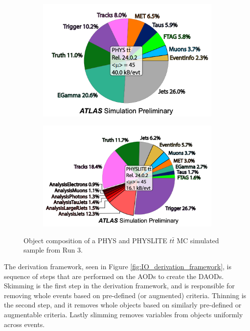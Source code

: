 \begin{figure}[h]
  \centering
  \vspace{20px}
  \begin{subfigure}{.5\textwidth}
      \centering
      \includegraphics[width=\textwidth]{content/img/tt_PHYS.png}
      \label{fig:IO_tt_PHYS_subA}
    \end{subfigure}%
    \begin{subfigure}{.5\textwidth}
      \centering
      \includegraphics[width=\textwidth]{content/img/tt_PHYSLITE.png}
      \label{fig:IO_tt_PHYSLITE_subB}
    \end{subfigure}%
  \caption{Object composition of a PHYS and PHYSLITE $t\bar{t}$ MC simulated sample from Run 3.}
  \vspace{10px}
  \label{fig:IO_tt_PHYS_vs_PHYSLITE}
\end{figure}


The derivation framework, seen in Figure \ref{fig:IO_derivation_framework}, is sequence of steps that are performed on the AODs to create the DAODs.
Skimming is the first step in the derivation framework, and is responsible for removing whole events based on pre-defined (or augmented) criteria.
Thinning is the second step, and it removes whole objects based on similarly pre-defined or augmentable criteria.
Lastly slimming removes variables from objects uniformly across events. 


